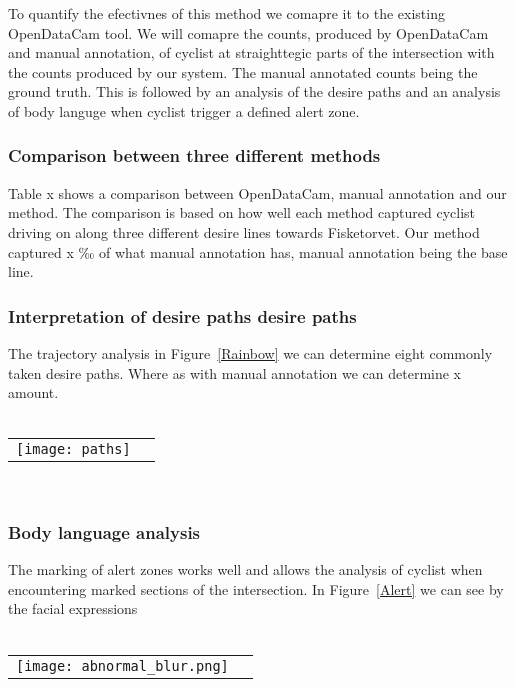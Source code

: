 To quantify the efectivnes of this method we comapre it to the existing OpenDataCam tool.
We will comapre the counts, produced by OpenDataCam and manual annotation, of cyclist at straighttegic parts of the intersection 
with the counts produced by our system.  The manual annotated counts being the ground truth.
This is followed by an analysis of the desire paths and an analysis of body languge when cyclist trigger a defined
alert zone.
\ \\ 

\subsubsection{Comparison between three different methods}
Table x shows a comparison between OpenDataCam, manual annotation and our method.
The comparison is based on how well each method captured cyclist driving on along three different 
desire lines towards Fisketorvet.
Our method captured x ‰ of what manual annotation has, manual annotation being the base line.
\ \\

\subsubsection{Interpretation of desire paths desire paths}
The trajectory analysis in Figure~\ref{Rainbow} we can determine eight commonly taken desire paths. 
Where as with manual annotation we can determine x amount.
\ \\
\raggedbottom
\ \\ 
\noindent
\begin{tabular}{@{}cc}
\texttt{[image: paths]} 
\end{tabular}
\label{traject}

\ \\
\subsubsection{Body language analysis}
The marking of alert zones works well and allows the analysis of cyclist when encountering marked sections of the 
intersection. In Figure~\ref{Alert} we can see by the facial expressions 
\ \\
\raggedbottom
\ \\ 
\noindent
\begin{tabular}{@{}cc}
\texttt{[image: abnormal\_blur.png]} 
\end{tabular}
\label{Alert}
\ \\

